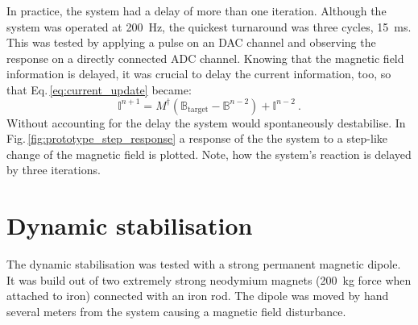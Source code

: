 In practice, the system had a delay of more than one iteration. Although the system was operated at \SI{200}{\hertz}, the quickest turnaround was three cycles, \SI{15}{\milli\second}. This was tested by applying a pulse on an DAC channel and observing the response on a directly connected ADC channel. Knowing that the magnetic field information is delayed, it was crucial to delay the current information, too, so that Eq.\,\ref{eq:current_update} became:
\begin{equation}
  \mathbb{I}^{n+1} = M^\dagger \left( \mathbb{B}_\text{target} - \mathbb{B}^{n-2} \right) + \mathbb{I}^{n-2} \ .
\end{equation}
Without accounting for the delay the system would spontaneously destabilise. In Fig.\,\ref{fig:prototype_step_response} a response of the the system to a step-like change of the magnetic field is plotted. Note, how the system's reaction is delayed by three iterations.






\section{Dynamic stabilisation}
The dynamic stabilisation was tested with a strong permanent magnetic dipole. It was build out of two extremely strong neodymium magnets (\SI{200}{\kilo\gram} force when attached to iron) connected with an iron rod. The dipole was moved by hand several meters from the system causing a magnetic field disturbance.


